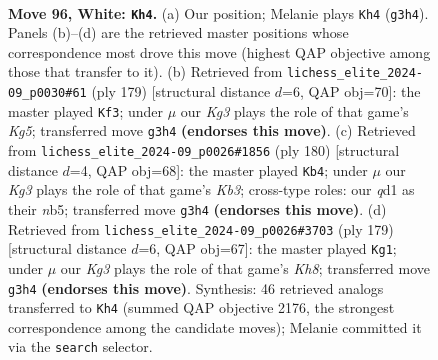 \documentclass[11pt]{article}
\begin{document}
\clearpage

\begin{figure}[p]\centering
\begin{subfigure}{0.46\textwidth}\centering
\resizebox{\linewidth}{!}{%
\newchessgame
\chessboard[
  setfen={8/6q1/8/8/2p1k3/6K1/8/3q4 w - - 2 96},
  showmover=false,
  pgfstyle=straightmove, color=movearrow, markmove={g3-h4}
]}
\caption{}
\end{subfigure}\hfill
\begin{subfigure}{0.46\textwidth}\centering
\resizebox{\linewidth}{!}{%
\newchessgame
\chessboard[
  setfen={6Q1/8/5K2/8/6k1/8/8/8 b - - 0 90},
  showmover=false,
  pgfstyle=straightmove, color=movearrow, markmove={g4-f3}
]}
\caption{}
\end{subfigure}
\\[4pt]
\begin{subfigure}{0.46\textwidth}\centering
\resizebox{\linewidth}{!}{%
\newchessgame
\chessboard[
  setfen={8/4k3/8/1n6/8/1K3q2/8/8 w - - 24 91},
  showmover=false,
  pgfstyle=straightmove, color=movearrow, markmove={b3-b4}
]}
\caption{}
\end{subfigure}\hfill
\begin{subfigure}{0.46\textwidth}\centering
\resizebox{\linewidth}{!}{%
\newchessgame
\chessboard[
  setfen={8/8/8/7Q/8/6K1/8/7k b - - 26 90},
  showmover=false,
  pgfstyle=straightmove, color=movearrow, markmove={h1-g1}
]}
\caption{}
\end{subfigure}
\caption{\textbf{Move 96, White: \texttt{Kh4}.} (a) Our position; Melanie plays \texttt{Kh4} (\texttt{g3h4}). Panels (b)--(d) are the retrieved master positions whose correspondence most drove this move (highest QAP objective among those that transfer to it). (b) Retrieved from \texttt{lichess\_elite\_2024-09\_p0030\#61} (ply 179) [structural distance $d$=6, QAP obj=70]: the master played \texttt{Kf3}; under $\mu$ our \emph{Kg3} plays the role of that game's \emph{Kg5}; transferred move \texttt{g3h4} \textbf{(endorses this move)}. (c) Retrieved from \texttt{lichess\_elite\_2024-09\_p0026\#1856} (ply 180) [structural distance $d$=4, QAP obj=68]: the master played \texttt{Kb4}; under $\mu$ our \emph{Kg3} plays the role of that game's \emph{Kb3}; cross-type roles: our \emph{q}d1 as their \emph{n}b5; transferred move \texttt{g3h4} \textbf{(endorses this move)}. (d) Retrieved from \texttt{lichess\_elite\_2024-09\_p0026\#3703} (ply 179) [structural distance $d$=6, QAP obj=67]: the master played \texttt{Kg1}; under $\mu$ our \emph{Kg3} plays the role of that game's \emph{Kh8}; transferred move \texttt{g3h4} \textbf{(endorses this move)}. Synthesis: 46 retrieved analogs transferred to \texttt{Kh4} (summed QAP objective 2176, the strongest correspondence among the candidate moves); Melanie committed it via the \texttt{search} selector.}
\label{fig:thought-m190}
\end{figure}
\end{document}
